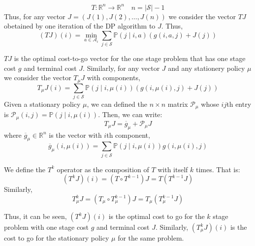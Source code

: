 \begin{definition}[T operator]
    \[
        T : \mathbb{R}^n \to  \mathbb{R}^n \quad n = \vert \mathcal{S}  \vert -1
    \]
    Thus, for any vector \(J = (J(1), J(2), \dots , J(n))\) we consider the vector \(TJ\) 
    obetained by one iteration of the DP algorithm to \(J\). Thus,
    \[
       (TJ)(i) = \min_{a \in \mathcal{A}_i} \sum_{j \in \mathcal{S} } \mathbb{P} (j\mid i,a) ( 
            g(i,a,j) + J(j) )
    \] 
\end{definition}
\(TJ\) is the optimal cost-to-go vector for the one stage problem that has one stage cost \(g\) and terminal
cost \(J\). Similarly, for any vector \(J\) and any stationery policy \(\mu \)  we consider the vector
\(T_\mu J\) with components,
\[
    T_\mu J(i) = \sum_{j \in \mathcal{S} } \mathbb{P} (j\mid i,\mu(i)) ( 
        g(i,\mu(i),j) + J(j) )
\]
Given a stationary policy \(\mu \), we can defined the \(n\times n\) matrix \(\mathcal{P} _\mu \) whose \(ij\)th entry 
is \(\mathcal{P}_\mu (i,j) = \mathbb{P} (j \mid i, \mu (i))\). Then, we can write:
\[
    T_\mu J = \overline{g}_\mu +\mathcal{P}_\mu J  
\]
where \(\overline{g}_\mu \in \mathbb{R}^n\) is the vector with \(i\)th component,
\[
    \overline{g}_\mu (i, \mu(i)) = \sum_{j \in \mathcal{S} } \mathbb{P} (j\mid i,\mu(i)) g(i,\mu(i),j)
\]

\begin{definition}[\(T^k\) operator]
    We define the \(T^k\) operator as the composition of \(T\) with itself \(k\) times. That is:
    \[
        (T^k J)(i) = ( T \circ T^{k-1} )J = T(T^{k-1}J)
    \]
    Similarly,
    \[
        T^k_\mu J = (T_\mu \circ T^{k-1}_\mu )J = T_\mu (T^{k-1}_\mu J)
    \]
\end{definition}
Thus, it can be seen, \((T^k J)(i)\) is the optimal cost to go for the \(k\) stage problem with one stage cost \(g\)
and terminal cost \(J\). Similarly, \((T^k_\mu J)(i)\) is the cost to go for the stationary policy \(\mu \) for the
same problem.\\

